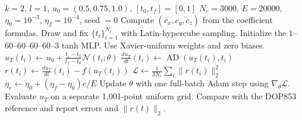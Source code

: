 \begin{algorithm}[tbp]
\caption{Training and evaluation of the hard-IC Lorenz--1960 PINN}
\label{alg:hard-ic-pinn}
\begin{algorithmic}[1]
\Require $k=2$, $l=1$, $u_0=(0.5,0.75,1.0)$, $[t_0,t_f]=[0,1]$
\Require $N_c=3000$, $E=20000$, $\eta_0=10^{-3}$, $\eta_f=10^{-4}$, seed $=0$
\State Compute $(c_x,c_y,c_z)$ from the coefficient formulas.
\State Draw and fix $\{t_i\}_{i=1}^{N_c}$ with Latin-hypercube sampling.
\State Initialize the $1$--$60$--$60$--$60$--$60$--$3$ tanh MLP.
\State Use Xavier-uniform weights and zero biases.
    \State $u_T(t_i)\gets u_0+\frac{t_i-t_0}{t_f-t_0}\mathcal{N}(t_i;\theta)$
    \State $\frac{d u_T}{d t}(t_i)\gets\operatorname{AD}(u_T(t_i),t_i)$
    \State $r(t_i)\gets\frac{d u_T}{d t}(t_i)-f(u_T(t_i))$
    \State $\mathcal{L}\gets\frac{1}{3N_c}\sum_i\|r(t_i)\|_2^2$
    \State $\eta_e\gets\eta_0+(\eta_f-\eta_0)e/E$
    \State Update $\theta$ with one full-batch Adam step using $\nabla_\theta\mathcal{L}$.
\EndFor
\State Evaluate $u_T$ on a separate 1,001-point uniform grid.
\State Compare with the DOP853 reference and report errors and $\|r(t)\|_2$.
\end{algorithmic}
\end{algorithm}